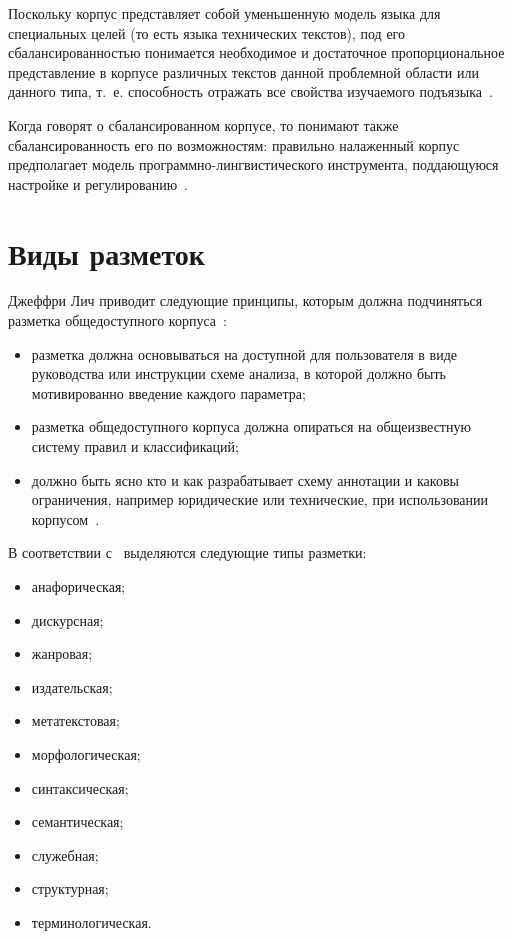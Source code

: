 Поскольку корпус представляет собой уменьшенную модель языка для специальных целей (то есть языка технических текстов), под его сбалансированностью понимается необходимое и достаточное пропорциональное представление в корпусе различных текстов данной проблемной области или данного типа, т.~е. способность отражать все свойства изучаемого подъязыка~\cite{ZaharovSpec}.

Когда говорят о сбалансированном корпусе, то понимают также сбалансированность его по возможностям: правильно налаженный корпус предполагает модель программно-лин\-гви\-сти\-че\-ско\-го инструмента, поддающуюся настройке и регулированию~\cite{ZaharovSpec}.

\section{Виды разметок}

Джеффри Лич приводит следующие принципы, которым должна подчиняться разметка общедоступного корпуса~\cite{Leech1997}:
\begin{itemize}
	\item разметка должна основываться на доступной для пользователя в виде руководства или инструкции схеме анализа, в которой должно быть мотивированно введение каждого параметра;
	\item разметка общедоступного корпуса должна опираться на общеизвестную систему правил и классификаций;
	\item должно быть ясно кто и как разрабатывает схему аннотации и каковы ограничения, например юридические или технические, при использовании корпусом~\cite{Kopotev}.
\end{itemize}

В соответствии с~\cite{Lesnikov,Zaharov,Kopotev,trudy2019} выделяются следующие типы разметки:
\begin{itemize}
	\item анафорическая;
	\item дискурсная;
	\item жанровая;
	\item издательская;
	\item метатекстовая;
	\item морфологическая;
	\item синтаксическая;
	\item семантическая;
	\item служебная;
	\item структурная;
	\item терминологическая.
\end{itemize}

